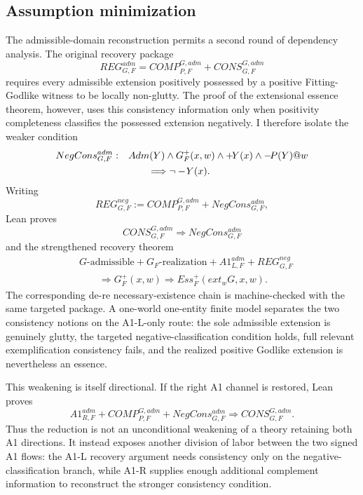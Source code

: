 \subsection{Assumption minimization}
\label{sec:fitting-minimality}

The admissible-domain reconstruction permits a second round of dependency analysis. The original recovery package
\[
  REG_{G,F}^{adm}
  =COMP_{P,F}^{G,adm}+CONS_{G,F}^{G,adm}
\]
requires every admissible extension positively possessed by a positive Fitting-Godlike witness to be locally non-glutty. The proof of the extensional essence theorem, however, uses this consistency information only when positivity completeness classifies the possessed extension negatively. I therefore isolate the weaker condition
\[
\begin{split}
  NegCons_{G,F}^{adm}:\quad
  &Adm(Y)\land G_F^+(x,w)\land +\!Y(x)\land -\!P(Y)@w\\
  &\qquad\Longrightarrow \neg-\!Y(x).
\end{split}
\]
Writing
\[
  REG_{G,F}^{neg}
  :=COMP_{P,F}^{G,adm}+NegCons_{G,F}^{adm},
\]
Lean proves
\[
  CONS_{G,F}^{G,adm}\Longrightarrow NegCons_{G,F}^{adm}
\]
and the strengthened recovery theorem
\[
\begin{split}
  &G\text{-admissible}
  +G_F\text{-realization}
  +A1_{L,F}^{adm}
  +REG_{G,F}^{neg}\\
  &\qquad\Longrightarrow
  G_F^+(x,w)\Rightarrow Ess_F^+(ext_wG,x,w).
\end{split}
\]
The corresponding de-re necessary-existence chain is machine-checked with the same targeted package. A one-world one-entity finite model separates the two consistency notions on the A1-L-only route: the sole admissible extension is genuinely glutty, the targeted negative-classification condition holds, full relevant exemplification consistency fails, and the realized positive Godlike extension is nevertheless an essence.

This weakening is itself directional. If the right A1 channel is restored, Lean proves
\[
  A1_{R,F}^{adm}
  +COMP_{P,F}^{G,adm}
  +NegCons_{G,F}^{adm}
  \Longrightarrow
  CONS_{G,F}^{G,adm}.
\]
Thus the reduction is not an unconditional weakening of a theory retaining both A1 directions. It instead exposes another division of labor between the two signed A1 flows: the A1-L recovery argument needs consistency only on the negative-classification branch, while A1-R supplies enough additional complement information to reconstruct the stronger consistency condition.

